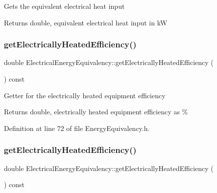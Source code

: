 Gets the equivalent electrical heat input \begin{DoxyReturn}{Returns}
double, equivalent electrical heat input in kW 
\end{DoxyReturn}
\mbox{\label{class_electrical_energy_equivalency_a83438510f522aa045f4b1007fca1d2fd}} 
\subsubsection{\texorpdfstring{get\+Electrically\+Heated\+Efficiency()}{getElectricallyHeatedEfficiency()}\hspace{0.1cm}{\footnotesize\ttfamily [1/3]}}
{\footnotesize\ttfamily double Electrical\+Energy\+Equivalency\+::get\+Electrically\+Heated\+Efficiency (\begin{DoxyParamCaption}{ }\end{DoxyParamCaption}) const\hspace{0.3cm}{\ttfamily [inline]}}

Getter for the electrically heated equipment efficiency

\begin{DoxyReturn}{Returns}
double, electrically heated equipment efficiency as \% 
\end{DoxyReturn}


Definition at line 72 of file Energy\+Equivalency.\+h.

\mbox{\label{class_electrical_energy_equivalency_a83438510f522aa045f4b1007fca1d2fd}} 
\subsubsection{\texorpdfstring{get\+Electrically\+Heated\+Efficiency()}{getElectricallyHeatedEfficiency()}\hspace{0.1cm}{\footnotesize\ttfamily [2/3]}}
{\footnotesize\ttfamily double Electrical\+Energy\+Equivalency\+::get\+Electrically\+Heated\+Efficiency (\begin{DoxyParamCaption}{ }\end{DoxyParamCaption}) const\hspace{0.3cm}{\ttfamily [inline]}}

